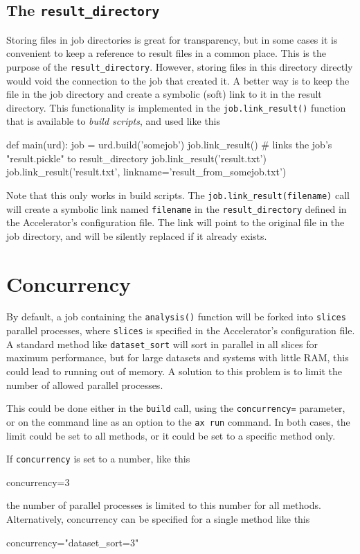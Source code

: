 \subsection{The \texttt{result\_directory}}
\label{sec:RESULT_DIR}
Storing files in job directories is great for transparency, but in
some cases it is convenient to keep a reference to result files in a
common place.  This is the purpose of the \texttt{result\_directory}.
However, storing files in this directory directly would void the
connection to the job that created it.  A better way is to keep the
file in the job directory and create a symbolic (soft) link to it in
the result directory.  This functionality is implemented in the
\texttt{job.link\_result()} function that is available to
\textsl{build scripts}, and used like this
\begin{python}
def main(urd):
    job = urd.build('somejob')
    job.link_result()  # links the job's "result.pickle" to result_directory
    job.link_result('result.txt')
    job.link_result('result.txt', linkname='result_from_somejob.txt')
\end{python}
Note that this only works in build scripts.  The
\texttt{job.link\_result(filename)} call will create a symbolic link
named \texttt{filename} in the \texttt{result\_directory} defined in
the Accelerator's configuration file.  The link will point to the
original file in the job directory, and will be silently replaced if
it already exists.



\section{Concurrency}
\label{sec:concurrency}
By default, a job containing the \texttt{analysis()} function will be
forked into \texttt{slices} parallel processes, where \texttt{slices}
is specified in the Accelerator's configuration file.  A standard
method like \texttt{dataset\_sort} will sort in parallel in all slices
for maximum performance, but for large datasets and systems with
little RAM, this could lead to running out of memory.  A solution to
this problem is to limit the number of allowed parallel processes.

This could be done either in the \texttt{build} call, using the
\texttt{concurrency=} parameter, or on the command line as an option
to the \texttt{ax run} command.  In both cases, the limit could be set
to all methods, or it could be set to a specific method only.

If \texttt{concurrency} is set to a number, like this
\begin{python}
  concurrency=3
\end{python}
the number of parallel processes is limited to this number for all
methods.  Alternatively, concurrency can be specified for a single
method like this
\begin{python}
  concurrency="dataset_sort=3"
\end{python}

